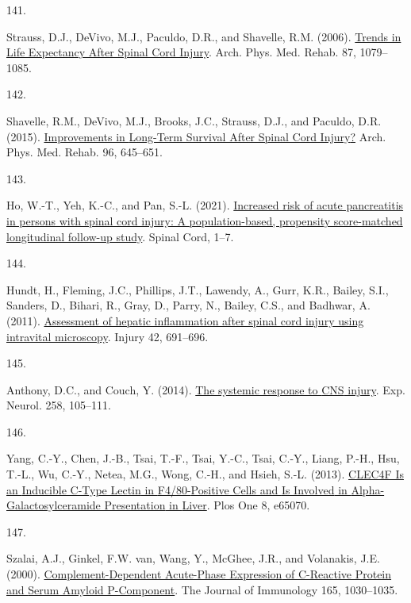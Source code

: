 \documentclass[
]{article}
\newlength{\cslhangindent}
\newlength{\csllabelwidth}
\newlength{\cslentryspacingunit} %
\newenvironment{CSLReferences}[2] %
 {%
  \setlength{\parindent}{0pt}
  \ifodd #1
  \let\oldpar\par
  \def\par{\hangindent=\cslhangindent\oldpar}
  \fi
  \setlength{\parskip}{#2\cslentryspacingunit}
 }%
 {}
\newcommand{\CSLLeftMargin}[1]{\parbox[t]{\csllabelwidth}{#1}}
\newcommand{\CSLRightInline}[1]{\parbox[t]{\linewidth - \csllabelwidth}{#1}\break}
\begin{document}
\begin{CSLReferences}{0}{0}
\leavevmode{}%
\CSLLeftMargin{141. }
\CSLRightInline{Strauss, D.J., DeVivo, M.J., Paculdo, D.R., and Shavelle, R.M. (2006). \href{https://doi.org/10.1016/j.apmr.2006.04.022}{Trends in {Life Expectancy After Spinal Cord Injury}}. Arch. Phys. Med. Rehab. 87, 1079--1085.}

\leavevmode{}%
\CSLLeftMargin{142. }
\CSLRightInline{Shavelle, R.M., DeVivo, M.J., Brooks, J.C., Strauss, D.J., and Paculdo, D.R. (2015). \href{https://doi.org/10.1016/j.apmr.2014.11.003}{Improvements in {Long-Term Survival After Spinal Cord Injury}?} Arch. Phys. Med. Rehab. 96, 645--651.}

\leavevmode{}%
\CSLLeftMargin{143. }
\CSLRightInline{Ho, W.-T., Yeh, K.-C., and Pan, S.-L. (2021). \href{https://doi.org/10.1038/s41393-021-00643-3}{Increased risk of acute pancreatitis in persons with spinal cord injury: A population-based, propensity score-matched longitudinal follow-up study}. Spinal Cord, 1--7.}

\leavevmode{}%
\CSLLeftMargin{144. }
\CSLRightInline{Hundt, H., Fleming, J.C., Phillips, J.T., Lawendy, A., Gurr, K.R., Bailey, S.I., Sanders, D., Bihari, R., Gray, D., Parry, N., Bailey, C.S., and Badhwar, A. (2011). \href{https://doi.org/10.1016/j.injury.2010.12.013}{Assessment of hepatic inflammation after spinal cord injury using intravital microscopy}. Injury 42, 691--696.}

\leavevmode{}%
\CSLLeftMargin{145. }
\CSLRightInline{Anthony, D.C., and Couch, Y. (2014). \href{https://doi.org/10.1016/j.expneurol.2014.03.013}{The systemic response to {CNS} injury}. Exp. Neurol. 258, 105--111.}

\leavevmode{}%
\CSLLeftMargin{146. }
\CSLRightInline{Yang, C.-Y., Chen, J.-B., Tsai, T.-F., Tsai, Y.-C., Tsai, C.-Y., Liang, P.-H., Hsu, T.-L., Wu, C.-Y., Netea, M.G., Wong, C.-H., and Hsieh, S.-L. (2013). \href{https://doi.org/10.1371/journal.pone.0065070}{{CLEC4F Is} an {Inducible C-Type Lectin} in {F4}/80-{Positive Cells} and {Is Involved} in {Alpha-Galactosylceramide Presentation} in {Liver}}. Plos One 8, e65070.}

\leavevmode{}%
\CSLLeftMargin{147. }
\CSLRightInline{Szalai, A.J., Ginkel, F.W. van, Wang, Y., McGhee, J.R., and Volanakis, J.E. (2000). \href{https://doi.org/10.4049/jimmunol.165.2.1030}{Complement-{Dependent Acute-Phase Expression} of {C-Reactive Protein} and {Serum Amyloid P-Component}}. The Journal of Immunology 165, 1030--1035.}


\end{CSLReferences}
\end{document}
